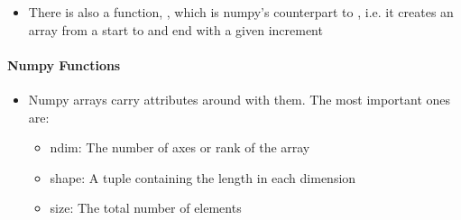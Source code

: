 \documentclass[letterpaper,10pt,english,openany]{sphinxmanual}
\begin{document}
\begin{sphinxVerbatim}[commandchars=\\\{\}]
 
  \PYG{p}{[}   \PYG{p}{]}
\end{sphinxVerbatim}
\begin{itemize}
\item {} 
There is also a function, , which is numpy’s counterpart to
, i.e. it creates an array from a start to and end with a
given increment

\end{itemize}

\begin{sphinxVerbatim}[commandchars=\\\{\}]
    
\end{sphinxVerbatim}


\paragraph{Numpy Functions}
\label{\detokenize{introduction_to_python/using_modules:numpy-functions}}\begin{itemize}
\item {} 
Numpy arrays carry attributes around with them. The most important
ones are:
\begin{itemize}
\item {} 
ndim: The number of axes or rank of the array

\item {} 
shape: A tuple containing the length in each dimension

\item {} 
size: The total number of elements

\end{itemize}

\end{itemize}
\end{document}
